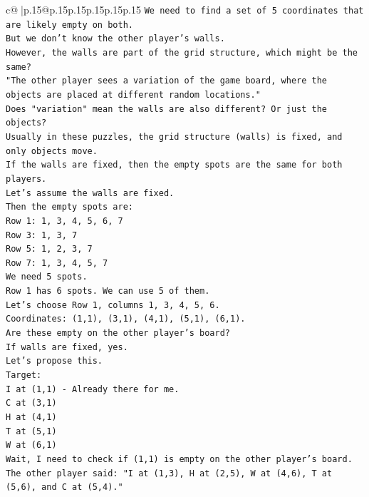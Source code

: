 \documentclass{article}
\begin{document}
{\begin{supertabular}{c@{$\;$}|p{.15\linewidth}@{}p{.15\linewidth}p{.15\linewidth}p{.15\linewidth}p{.15\linewidth}p{.15\linewidth}}
{{{\texttt{We need to find a set of 5 coordinates that are likely empty on both.} \\
\texttt{But we don't know the other player's walls.} \\
\texttt{However, the walls are part of the grid structure, which might be the same?} \\
\texttt{"The other player sees a variation of the game board, where the objects are placed at different random locations."} \\
\texttt{Does "variation" mean the walls are also different? Or just the objects?} \\
\texttt{Usually in these puzzles, the grid structure (walls) is fixed, and only objects move.} \\
\texttt{If the walls are fixed, then the empty spots are the same for both players.} \\
\texttt{Let's assume the walls are fixed.} \\
\texttt{Then the empty spots are:} \\
\texttt{Row 1: 1, 3, 4, 5, 6, 7} \\
\texttt{Row 3: 1, 3, 7} \\
\texttt{Row 5: 1, 2, 3, 7} \\
\texttt{Row 7: 1, 3, 4, 5, 7} \\
\texttt{We need 5 spots.} \\
\texttt{Row 1 has 6 spots. We can use 5 of them.} \\
\texttt{Let's choose Row 1, columns 1, 3, 4, 5, 6.} \\
\texttt{Coordinates: (1,1), (3,1), (4,1), (5,1), (6,1).} \\
\texttt{Are these empty on the other player's board?} \\
\texttt{If walls are fixed, yes.} \\
\texttt{Let's propose this.} \\
\texttt{Target:} \\
\texttt{I at (1,1) {-} Already there for me.} \\
\texttt{C at (3,1)} \\
\texttt{H at (4,1)} \\
\texttt{T at (5,1)} \\
\texttt{W at (6,1)} \\
\texttt{Wait, I need to check if (1,1) is empty on the other player's board.} \\
\texttt{The other player said: "I at (1,3), H at (2,5), W at (4,6), T at (5,6), and C at (5,4)."} \\
}}}
\end{supertabular}}
\end{document}
